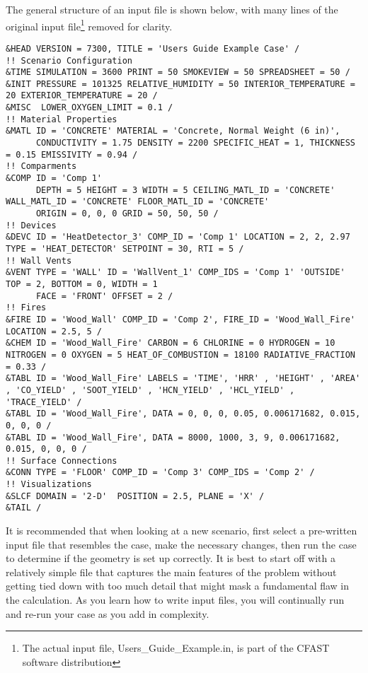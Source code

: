 The general structure of an input file is shown below, with many lines of the original input file\footnote{The actual input file, Users\_Guide\_Example.in, is part of the CFAST software distribution} removed for clarity.

\clearpage
\begin{lstlisting}[basicstyle=\tiny]
&HEAD VERSION = 7300, TITLE = 'Users Guide Example Case' /
!! Scenario Configuration
&TIME SIMULATION = 3600 PRINT = 50 SMOKEVIEW = 50 SPREADSHEET = 50 /
&INIT PRESSURE = 101325 RELATIVE_HUMIDITY = 50 INTERIOR_TEMPERATURE = 20 EXTERIOR_TEMPERATURE = 20 /
&MISC  LOWER_OXYGEN_LIMIT = 0.1 /
!! Material Properties
&MATL ID = 'CONCRETE' MATERIAL = 'Concrete, Normal Weight (6 in)',
      CONDUCTIVITY = 1.75 DENSITY = 2200 SPECIFIC_HEAT = 1, THICKNESS = 0.15 EMISSIVITY = 0.94 /
!! Comparments
&COMP ID = 'Comp 1'
      DEPTH = 5 HEIGHT = 3 WIDTH = 5 CEILING_MATL_ID = 'CONCRETE' WALL_MATL_ID = 'CONCRETE' FLOOR_MATL_ID = 'CONCRETE'
      ORIGIN = 0, 0, 0 GRID = 50, 50, 50 /
!! Devices
&DEVC ID = 'HeatDetector_3' COMP_ID = 'Comp 1' LOCATION = 2, 2, 2.97 TYPE = 'HEAT_DETECTOR' SETPOINT = 30, RTI = 5 /
!! Wall Vents
&VENT TYPE = 'WALL' ID = 'WallVent_1' COMP_IDS = 'Comp 1' 'OUTSIDE'  TOP = 2, BOTTOM = 0, WIDTH = 1
      FACE = 'FRONT' OFFSET = 2 /
!! Fires
&FIRE ID = 'Wood_Wall' COMP_ID = 'Comp 2', FIRE_ID = 'Wood_Wall_Fire'  LOCATION = 2.5, 5 /
&CHEM ID = 'Wood_Wall_Fire' CARBON = 6 CHLORINE = 0 HYDROGEN = 10 NITROGEN = 0 OXYGEN = 5 HEAT_OF_COMBUSTION = 18100 RADIATIVE_FRACTION = 0.33 /
&TABL ID = 'Wood_Wall_Fire' LABELS = 'TIME', 'HRR' , 'HEIGHT' , 'AREA' , 'CO_YIELD' , 'SOOT_YIELD' , 'HCN_YIELD' , 'HCL_YIELD' , 'TRACE_YIELD' /
&TABL ID = 'Wood_Wall_Fire', DATA = 0, 0, 0, 0.05, 0.006171682, 0.015, 0, 0, 0 /
&TABL ID = 'Wood_Wall_Fire', DATA = 8000, 1000, 3, 9, 0.006171682, 0.015, 0, 0, 0 /
!! Surface Connections
&CONN TYPE = 'FLOOR' COMP_ID = 'Comp 3' COMP_IDS = 'Comp 2' /
!! Visualizations
&SLCF DOMAIN = '2-D'  POSITION = 2.5, PLANE = 'X' /
&TAIL /

\end{lstlisting}
It is recommended that when looking at a new scenario, first select a pre-written input file that resembles the case, make the necessary changes, then run the case to determine if the geometry is set up correctly. It is best to start off with a relatively simple file that captures the main features of the problem without getting tied down with too much detail that might mask a fundamental flaw in the calculation. As you learn how to write input files, you will continually run and re-run your case as you add in complexity.

